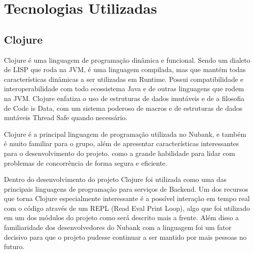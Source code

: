\chapter{Tecnologias Utilizadas}
	\section{Clojure}
	
	Clojure é uma linguagem de programação dinâmica e funcional. Sendo um dialeto de LISP que roda na JVM, é uma linguagem compilada, mas que mantém todas características dinâmicas a ser utilizadas em Runtime. Possui compatibilidade e interoperabilidade com todo ecossistema Java e de outras linguagens que rodem na JVM. Clojure enfatiza o uso de estruturas de dados imutáveis e de a filosofia de Code is Data, com um sistema poderoso de macros e de estruturas de dados mutáveis Thread Safe quando necessário. \cite{clojurerationale}
	
	Clojure é a principal linguagem de programação utilizada no Nubank, e também é muito familiar para o grupo, além de apresentar características interessantes para o desenvolvimento do projeto. como a grande habilidade para lidar com problemas de concorrência de forma segura e eficiente.
	
	Dentro do desenvolvimento do projeto Clojure foi utilizada como uma das principais linguagens de programação para serviços de Backend. Um dos recursos que torna Clojure especialmente interessante é a possível interação em tempo real com o código através de um REPL (Read Eval Print Loop), algo que foi utilizado em um dos módulos do projeto como será descrito mais a frente. Além disso a familiaridade dos desenvolvedores do Nubank com a linguagem foi um fator decisivo para que o projeto pudesse continuar a ser mantido por mais pessoas no futuro.
	
